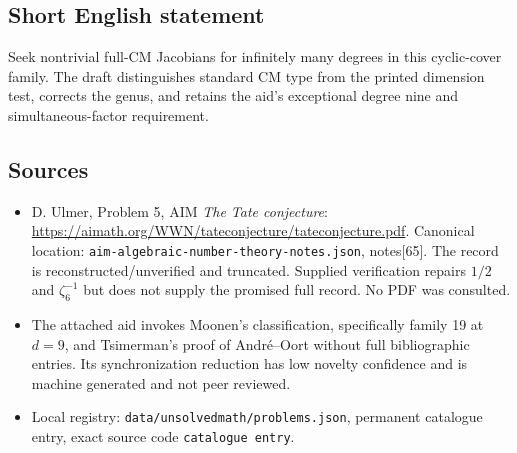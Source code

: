 \documentclass[11pt]{article}
\begin{document}
\subsection{Short English statement}
Seek nontrivial full-CM Jacobians for infinitely many degrees in this cyclic-cover family. The draft distinguishes standard CM type from the printed dimension test, corrects the genus, and retains the aid's exceptional degree nine and simultaneous-factor requirement.
\subsection{Sources}
\begin{itemize}
\item D. Ulmer, Problem 5, AIM \emph{The Tate conjecture}: \url{https://aimath.org/WWN/tateconjecture/tateconjecture.pdf}. Canonical location: \texttt{aim-algebraic-number-theory-notes.json}, notes[65]. The record is reconstructed/unverified and truncated. Supplied verification repairs $1/2$ and $\zeta_6^{-1}$ but does not supply the promised full record. No PDF was consulted.
\item The attached aid invokes Moonen's classification, specifically family 19 at $d=9$, and Tsimerman's proof of Andr\'e--Oort without full bibliographic entries. Its synchronization reduction has low novelty confidence and is machine generated and not peer reviewed.
\item Local registry: \texttt{data/unsolvedmath/problems.json}, permanent catalogue entry, exact source code \texttt{catalogue entry}.
\end{itemize}
\end{document}
